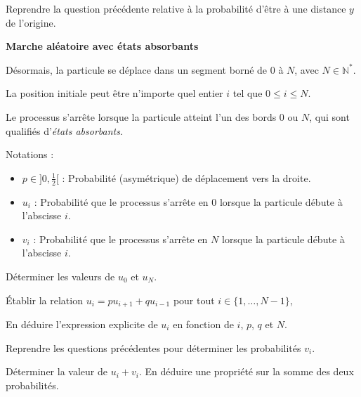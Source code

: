 \documentclass[10pt,a4paper]{article}
\begin{document}
\q Reprendre la question précédente relative à la probabilité d'être à une distance \( y \) de
l'origine.

\bigskip

\textbf{Marche aléatoire avec états absorbants}

\medskip

Désormais, la particule se déplace dans un segment borné de \( 0 \) à \( N \), avec \( N \in
\mathbb{N}^* \).

La position initiale peut être n'importe quel entier \( i \) tel que \( 0 \leq i \leq N \).

Le processus s'arrête lorsque la particule atteint l'un des bords \( 0 \) ou \( N \), qui sont
qualifiés d'\emph{états absorbants}.

\medskip

Notations :
\begin{itemize}
 \item \( p \in  ]0, \frac{1}{2}[ \) : Probabilité (asymétrique) de déplacement vers la droite.
 \item \( u_i \) : Probabilité que le processus s'arrête en \( 0 \) lorsque la particule débute à l'abscisse \( i \).
 \item \( v_i \) : Probabilité que le processus s'arrête en \( N \) lorsque la particule débute à l'abscisse \( i \).
\end{itemize}

\q Déterminer les valeurs de \( u_0 \) et \( u_N \).

\q Établir la relation \( u_i = p u_{i+1} + q u_{i-1} \) pour tout \( i \in \{1, \dots, N-1\} \),

\q En déduire l'expression explicite de \( u_i \) en fonction de \( i \), \( p \), \( q \) et \( N
\).

\q Reprendre les questions précédentes pour déterminer les probabilités \( v_i \).

\q Déterminer la valeur de \( u_i + v_i \). En déduire une propriété sur la somme des deux
probabilités.
\end{document}
